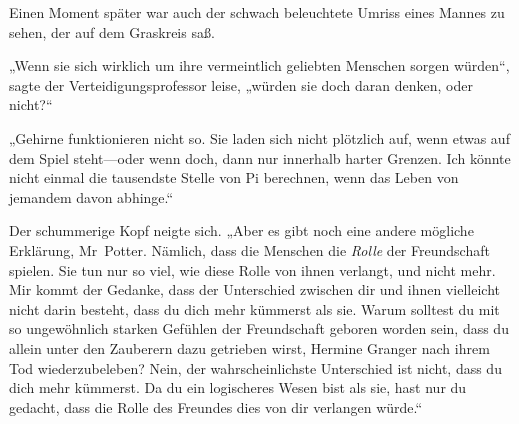 Einen Moment später war auch der schwach beleuchtete Umriss eines Mannes zu sehen, der auf dem Graskreis saß.

„Wenn sie sich wirklich um ihre vermeintlich geliebten Menschen sorgen würden“, sagte der Verteidigungsprofessor leise, „würden sie doch daran denken, oder nicht?“

„Gehirne funktionieren nicht so. Sie laden sich nicht plötzlich auf, wenn etwas auf dem Spiel steht—oder wenn doch, dann nur innerhalb harter Grenzen. Ich könnte nicht einmal die tausendste Stelle von Pi berechnen, wenn das Leben von jemandem davon abhinge.“

Der schummerige Kopf neigte sich. „Aber es gibt noch eine andere mögliche Erklärung, Mr~Potter. Nämlich, dass die Menschen die \emph{Rolle} der Freundschaft spielen. Sie tun nur so viel, wie diese Rolle von ihnen verlangt, und nicht mehr. Mir kommt der Gedanke, dass der Unterschied zwischen dir und ihnen vielleicht nicht darin besteht, dass du dich mehr kümmerst als sie. Warum solltest du mit so ungewöhnlich starken Gefühlen der Freundschaft geboren worden sein, dass du allein unter den Zauberern dazu getrieben wirst, Hermine Granger nach ihrem Tod wiederzubeleben? Nein, der wahrscheinlichste Unterschied ist nicht, dass du dich mehr kümmerst. Da du ein logischeres Wesen bist als sie, hast nur du gedacht, dass die Rolle des Freundes dies von dir verlangen würde.“

